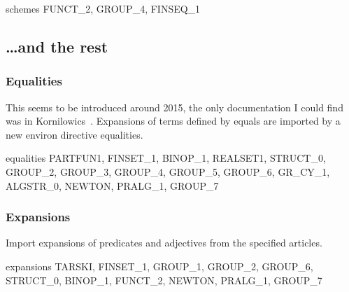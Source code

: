 \nwenddocs{}\endmoddef\nwstartdeflinemarkup{}\nwenddeflinemarkup
schemes FUNCT_2, GROUP_4, FINSEQ_1
\nwendcode{}\nwdocspar

\subsection{\dots and the rest}

\subsubsection{Equalities}
This seems to be introduced around 2015, the only documentation I could
find was in Kornilowics~\cite{kornilowicz2015definitional}.
Expansions of terms defined by {\Tt{}equals\nwendquote} are imported by a new
{\Tt{}environ\nwendquote} directive {\Tt{}equalities\nwendquote}.

\nwenddocs{}\endmoddef\nwstartdeflinemarkup{}\nwenddeflinemarkup
equalities PARTFUN1, FINSET_1, BINOP_1, REALSET1, STRUCT_0, GROUP_2,
  GROUP_3, GROUP_4, GROUP_5, GROUP_6, GR_CY_1,
  ALGSTR_0, NEWTON, PRALG_1, GROUP_7
\nwendcode{}\nwdocspar

\subsubsection{Expansions}
Import expansions of predicates and adjectives from the specified
articles.

\nwenddocs{}\endmoddef\nwstartdeflinemarkup{}\nwenddeflinemarkup
expansions TARSKI, FINSET_1, GROUP_1, GROUP_2, GROUP_6, STRUCT_0, BINOP_1,
  FUNCT_2, NEWTON, PRALG_1, GROUP_7
\nwendcode{}\nwdocspar

